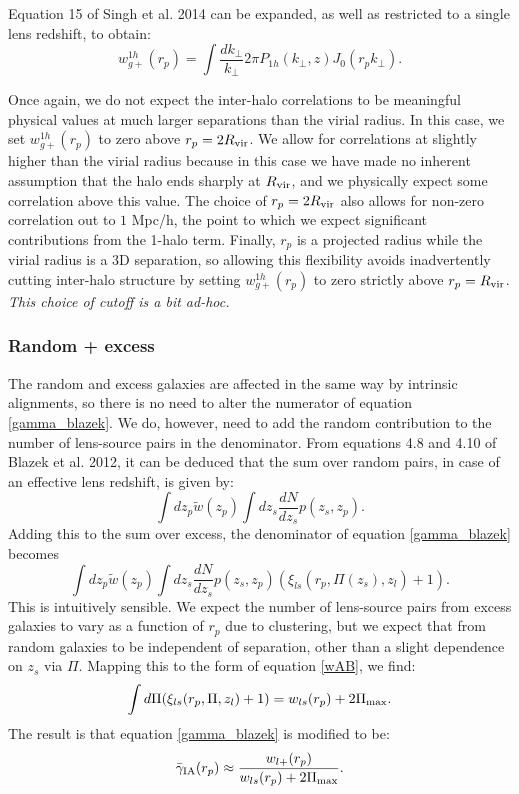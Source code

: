 \documentclass[onecolumn,amsmath,aps,fleqn, superscriptaddress]{revtex4}
\begin{document}
Equation 15 of Singh et al. 2014 can be expanded, as well as restricted to a single lens redshift, to obtain:
\begin{equation}
w_{g+}^{1h}(r_p) = \int \frac{dk_\perp}{k_\perp}{2\pi} P_{1h}(k_\perp,z) J_0(r_p k_\perp).
\label{wg1h}
\end{equation}

Once again, we do not expect the inter-halo correlations to be meaningful physical values at much larger separations than the virial radius. In this case, we set $w_{g+}^{1h}(r_p)$ to zero above $r_p = 2 R_{\rm vir}$. We allow for correlations at slightly higher than the virial radius because in this case we have made no inherent assumption that the halo ends sharply at $R_{\rm vir}$, and we physically expect some correlation above this value. The choice of $r_p = 2 R_{\rm vir}$ also allows for non-zero correlation out to $1$ Mpc/h, the point to which we expect significant contributions from the 1-halo term. Finally, $r_p$ is a projected radius while the virial radius is a 3D separation, so allowing this flexibility avoids inadvertently cutting inter-halo structure by setting $w_{g+}^{1h}(r_p)$ to zero strictly above $r_p = R_{\rm vir}$. {\it This choice of cutoff is a bit ad-hoc.}

\subsubsection*{Random + excess}
The random and excess galaxies are affected in the same way by intrinsic alignments, so there is no need to alter the numerator of equation \ref{gamma_blazek}.
 We do, however, need to add the random contribution to the number of lens-source pairs in the denominator. From equations 4.8 and 4.10 of Blazek et al. 2012, it can be deduced that the sum over random pairs, in case of an effective lens redshift, is given by:
\begin{equation}
\int dz_p \tilde{w}(z_p) \int dz_s \frac{dN}{dz_s} p(z_s, z_p).
\end{equation}
Adding this to the sum over excess, the denominator of equation \ref{gamma_blazek} becomes
\begin{equation}
\int dz_p \tilde{w}(z_p) \int dz_s \frac{dN}{dz_s} p(z_s, z_p) \left(\xi_{ls}(r_p, \Pi(z_s), z_l) + 1\right).
\label{denom_rand}
\end{equation}
This is intuitively sensible. We expect the number of lens-source pairs from excess galaxies to vary as a function of $r_p$ due to clustering, but we expect that from random galaxies to be independent of separation, other than a slight dependence on $z_s$ via $\Pi$. Mapping this to the form of equation \ref{wAB}, we find:
\begin{equation}
\int d\Pi (\xi_{ls}(r_p, \Pi, z_l) + 1) = w_{ls}(r_p) + 2\Pi_{\rm max}.
\label{wl}
\end{equation}
The result is that equation \ref{gamma_blazek} is modified to be:
\begin{equation}
\bar{\gamma}_{\rm IA}(r_p) \approx \frac{w_{l+}(r_p)}{w_{ls}(r_p) + 2 \Pi_{\rm max}}.
\label{gamma_blazek_randoms}
\end{equation} 
\end{document}
